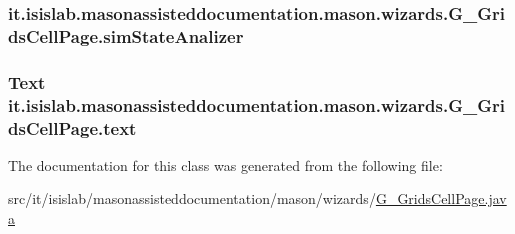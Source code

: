 \hypertarget{classit_1_1isislab_1_1masonassisteddocumentation_1_1mason_1_1wizards_1_1_g___grids_cell_page_a7880d671931d7229eb3d46f54fcc5697}{
\subsubsection[{sim\-State\-Analizer}]{ it.\-isislab.\-masonassisteddocumentation.\-mason.\-wizards.\-G\-\_\-\-Grids\-Cell\-Page.\-sim\-State\-Analizer\hspace{0.3cm}{\ttfamily [private]}}}\label{classit_1_1isislab_1_1masonassisteddocumentation_1_1mason_1_1wizards_1_1_g___grids_cell_page_a7880d671931d7229eb3d46f54fcc5697}
\hypertarget{classit_1_1isislab_1_1masonassisteddocumentation_1_1mason_1_1wizards_1_1_g___grids_cell_page_a04f37a0ddf6f1114dc54a0b9b6b97c03}{
\subsubsection[{text}]{\setlength{\rightskip}{0pt plus 5cm}Text it.\-isislab.\-masonassisteddocumentation.\-mason.\-wizards.\-G\-\_\-\-Grids\-Cell\-Page.\-text\hspace{0.3cm}{\ttfamily [private]}}}\label{classit_1_1isislab_1_1masonassisteddocumentation_1_1mason_1_1wizards_1_1_g___grids_cell_page_a04f37a0ddf6f1114dc54a0b9b6b97c03}


The documentation for this class was generated from the following file\-:\begin{DoxyCompactItemize}
\item 
src/it/isislab/masonassisteddocumentation/mason/wizards/\hyperlink{_g___grids_cell_page_8java}{G\-\_\-\-Grids\-Cell\-Page.\-java}\end{DoxyCompactItemize}
